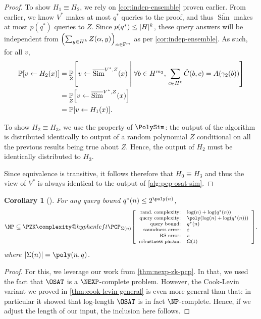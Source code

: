 \documentclass[english,12pt]{reedthesis}
\makeatletter
\theoremstyle{plain}
\newtheorem{cor}[cor]{Corollary}
\theoremstyle{definition}
\theoremstyle{remark}
\DeclareMathOperator{\Sim}{Sim}
\DeclarePairedDelimiter{\abs}{\lvert}{\rvert}
\newcommand{\middlemid}{%
  \ensuremath{\;\middle\vert\;}
}
\newcommand{\pzkpcpr}[6]{%
  \ensuremath%
  \mleft[{\footnotesize\begin{array}{r l}
    \text{rand.\ complexity:} & #1 \\
    \text{query complexity:} & #2 \\
    \text{query bound:} & #3 \\
    \text{soundness error:} & #4 \\
    \text{RS error:} & #5 \\
    \text{robustness param:} & #6
  \end{array}}\mright]%
}
\newcommand{\PZKPCP}{%
  \PZK\complexity@hyphenleft\PCP
}
\makeatother
\begin{document}
\begin{proof}
  To show $H_{1} \equiv H_{2}$, we rely on \cref{cor:indep-ensemble} proven earlier.
  From earlier, we know $V^{*}$ makes at most $q^{*}$ queries to the proof, and
  thus $\overline{\Sim}$ makes at most $p(q^{*})$ queries to $Z$. Since
  $p(q^{*}) \le \abs{H}^{k}$, these query answers will be independent from
  $\mleft(\sum_{y \in H^{k}}Z(\alpha, y)\mright)_{\alpha \in \mathbb{F}^{m}}$ as per
  \cref{cor:indep-ensemble}. As such, for all $v$,
  \begin{align*}
    \mathbb{P}[v \leftarrow H_{2}(x)] &= \underset{Z}{\mathbb{P}}\mleft[
                        v \leftarrow \overline{\Sim}^{V^{*}, Z}(x) \middlemid
                        \forall b \in H^{m_{2}},\,\sum_{c \in H^{k}}\hat{C}(b, c) = A(\gamma_{2}(b))
                      \mright] \\
                    &= \underset{Z}{\mathbb{P}}\mleft[
                        v \leftarrow \overline{\Sim}^{V^{*}, Z}(x)
                      \mright] \\
                    &= \mathbb{P}[v \leftarrow H_{1}(x)].
  \end{align*}

  To show $H_{2} \equiv H_{3}$, we use the property of $\PolySim$: the output of the
  algorithm is distributed identically to output of a random polynomial $Z$
  conditional on all the previous results being true about $Z$. Hence, the
  output of $H_{2}$ must be identically distributed to $H_{3}$.

  Since equivalence is transitive, it follows therefore that $H_{0} \equiv H_{3}$ and
  thus the view of $V^{*}$ is always identical to the output of
  \cref{alg:pcp-osat-sim}.
\end{proof}

\begin{cor}[{\cite[Theorem 6.3]{GOS25}}]\label{cor:np-zk-pcp}
  For any query bound $q^{*}(n) \le 2^{\poly(n)}$,
  \[
    \NP \subseteq
    \PZKPCP_{\Sigma(n)}\pzkpcpr{\log(n)+\log(q^{*}(n))}{\poly(\log(n) + \log(q^{*}(n)))}{q^{*}(n)}{\varepsilon}{s}{\Omega(1)}.
  \]
  where $\abs{\Sigma(n)} = \poly(n, q)$.
\end{cor}

\begin{proof}
  For this, we leverage our work from \cref{thm:nexp-zk-pcp}. In that, we used
  the fact that $\OSAT$ is a $\NEXP$-complete problem. However, the Cook-Levin
  variant we proved in \cref{thm:cook-levin-general} is even more general than
  that: in particular it showed that log-length $\OSAT$ is in fact
  $\NP$-complete. Hence, if we adjust the length of our input, the inclusion
  here follows.
\end{proof}
\end{document}
